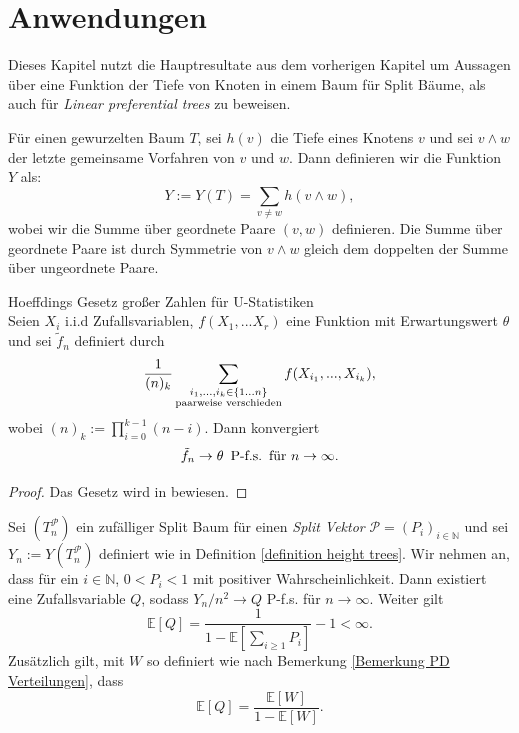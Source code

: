 \chapter{Anwendungen}
Dieses Kapitel nutzt die Hauptresultate aus dem vorherigen Kapitel um Aussagen über eine Funktion der Tiefe von Knoten in einem Baum für Split Bäume, als auch für \textit{Linear preferential trees} zu beweisen.  
\begin{Definition}
    \label{definition height trees}
    Für einen gewurzelten Baum $T$, sei $h(v)$ die Tiefe eines Knotens $v$ und sei $v\wedge w$ der letzte gemeinsame Vorfahren von $v$ und $w$. Dann definieren wir die Funktion $Y$ als:
    \[
        Y := Y(T) = \sum_{v \neq w}h(v \wedge w),
    \]
    wobei wir die Summe über geordnete Paare $(v,w)$ definieren. Die Summe über geordnete Paare ist durch Symmetrie von $v \wedge w$ gleich dem doppelten der Summe über ungeordnete Paare. 
\end{Definition}
\begin{theorem}\textnormal{Hoeffdings Gesetz großer Zahlen für U-Statistiken}\\
    \label{hoeffding theorem}
    Seien $X_i$ i.i.d Zufallsvariablen, $f(X_1,...X_r)$ eine Funktion mit Erwartungswert $\theta$ und sei $\tilde{f}_n$ definiert durch 
    \[
        \frac{1}{(n)_{k}}\sum_{\substack{i_1,...,i_k \in \{1...n\}\\ \textnormal{paarweise verschieden}}}f(X_{i_1},...,X_{i_k}),
    \]
    wobei $(n)_k := \prod_{i=0}^{k-1}(n-i)$.
    Dann konvergiert 
    \[
        \tilde{f}_n  \rightarrow \theta \hspace{5pt} \textnormal{P-f.s.} \hspace{5pt} \textnormal{für } n \rightarrow \infty.
    \]
\begin{proof}
    Das Gesetz wird in \cite{hoeffding1961strong} bewiesen.
\end{proof}
\end{theorem}
\begin{theorem}
    \label{big Q theorem}
    Sei $(T_n^\mathcal{P})$ ein zufälliger Split Baum für einen \textit{Split Vektor} $\mathcal{P} = (P_i)_{i \in \mathbb{N}}$ und sei $Y_n := Y(T^\mathcal{P}_n)$ definiert wie in Definition \ref{definition height trees}. Wir nehmen an, dass für ein $i \in \mathbb{N}$, $0< P_i < 1$ mit positiver Wahrscheinlichkeit. Dann existiert eine Zufallsvariable $Q$, sodass $Y_n/n^2 \rightarrow Q$ P-f.s. für $n \to \infty$. Weiter gilt 
    \begin{equation}
        \label{first equation of Q theorem}
    \mathbb{E}[Q]  = \frac{1}{1-\mathbb{E}[\sum_{i \geq 1}P_i ]}-1 < \infty. 
    \end{equation} 
    Zusätzlich gilt, mit $W$ so definiert wie nach Bemerkung \ref{Bemerkung PD Verteilungen}, dass 
\begin{equation}
    \mathbb{E}[Q] = \frac{\mathbb{E}[W]}{1 - \mathbb{E}[W]}.
        \label{third equation of Q theorem}
\end{equation}
\end{theorem}
